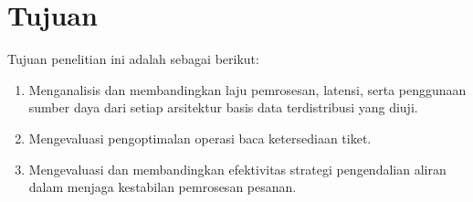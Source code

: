 \pagebreak

\section{Tujuan}

Tujuan penelitian ini adalah sebagai berikut:

\begin{enumerate}
    \item Menganalisis dan membandingkan laju pemrosesan, latensi, serta penggunaan sumber daya dari setiap arsitektur basis data terdistribusi yang diuji.
    \item Mengevaluasi pengoptimalan operasi baca ketersediaan tiket.
    \item Mengevaluasi dan membandingkan efektivitas strategi pengendalian aliran dalam menjaga kestabilan pemrosesan pesanan.
\end{enumerate}
